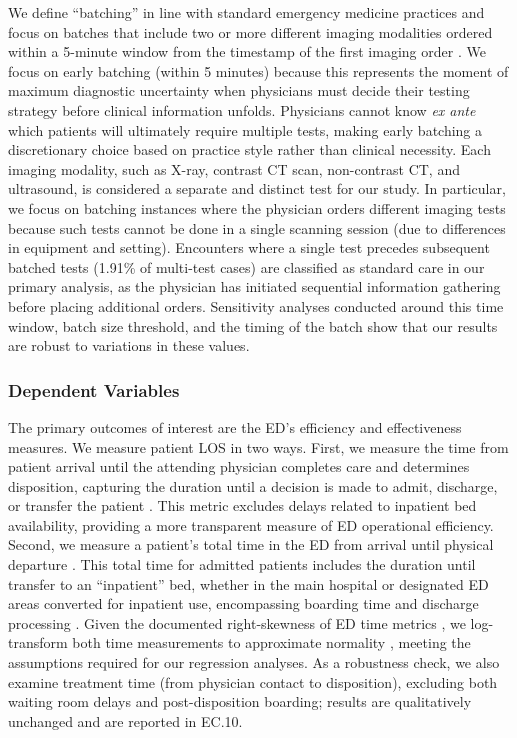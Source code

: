 \documentclass[,,blindrev]{informs}
\begin{document}
We define ``batching'' in line with standard emergency medicine
practices and focus on batches that include two or more different
imaging modalities ordered within a 5-minute window from the timestamp
of the first imaging order
\citep[\citet{jameson2024variation}]{su2025crisis}. We focus on early
batching (within 5 minutes) because this represents the moment of
maximum diagnostic uncertainty when physicians must decide their testing
strategy before clinical information unfolds. Physicians cannot know
\textit{ex ante} which patients will ultimately require multiple tests,
making early batching a discretionary choice based on practice style
rather than clinical necessity. Each imaging modality, such as X-ray,
contrast CT scan, non-contrast CT, and ultrasound, is considered a
separate and distinct test for our study. In particular, we focus on
batching instances where the physician orders different imaging tests
because such tests cannot be done in a single scanning session (due to
differences in equipment and setting). Encounters where a single test
precedes subsequent batched tests (1.91\% of multi-test cases) are
classified as standard care in our primary analysis, as the physician
has initiated sequential information gathering before placing additional
orders. Sensitivity analyses conducted around this time window, batch
size threshold, and the timing of the batch show that our results are
robust to variations in these values.

\subsubsection{Dependent Variables}\label{sec:dependentvar}

The primary outcomes of interest are the ED's efficiency and
effectiveness measures. We measure patient LOS in two ways. First, we
measure the time from patient arrival until the attending physician
completes care and determines disposition, capturing the duration until
a decision is made to admit, discharge, or transfer the patient
\citep{Feizi2023}. This metric excludes delays related to inpatient bed
availability, providing a more transparent measure of ED operational
efficiency. Second, we measure a patient's total time in the ED from
arrival until physical departure \citep{Lim2024}. This total time for
admitted patients includes the duration until transfer to an
``inpatient'' bed, whether in the main hospital or designated ED areas
converted for inpatient use, encompassing boarding time and discharge
processing \citep{Feizi2023}. Given the documented right-skewness of ED
time metrics \citep{Song2015}, we log-transform both time measurements
to approximate normality \citep[\citet{Saghafian2024}]{Brown2005},
meeting the assumptions required for our regression analyses. As a
robustness check, we also examine treatment time (from physician contact
to disposition), excluding both waiting room delays and post-disposition
boarding; results are qualitatively unchanged and are reported in EC.10.
\end{document}
